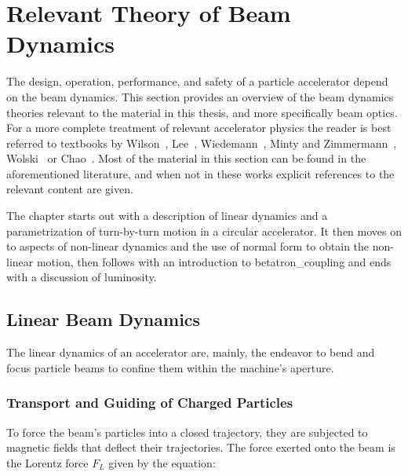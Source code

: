 \chapter{Relevant Theory of Beam Dynamics}
\label{chapter:theory}

The design, operation, performance, and safety of a particle accelerator depend on the \gls{beam} dynamics.
This section provides an overview of the beam dynamics theories relevant to the material in this thesis, and more specifically beam \gls{optics}.
For a more complete treatment of relevant accelerator physics the reader is best referred to textbooks by Wilson~\cite{BOOK:Wilson:Introcution_Particle_Accelerators}, Lee~\cite{BOOK:Lee:Accelerator_physics}, Wiedemann~\cite{BOOK:Wiedemann:Particle_Accelerator_Physics}, Minty and Zimmermann~\cite{BOOK:Minty:Measurements_Control_Charged_Particle_Beams}, Wolski~\cite{BOOK:Wolski:Beam_dynamics} or Chao~\cite{BOOK:Chao:Handbook_Accelerator_Physics_Engineering, BOOK:Chao:Collective_instabilities}.
Most of the material in this section can be found in the aforementioned literature, and when not in these works explicit references to the relevant content are given.

The chapter starts out with a description of linear dynamics and a parametrization of turn-by-turn motion in a circular accelerator.
It then moves on to aspects of non-linear dynamics and the use of normal form to obtain the non-linear motion, then follows with an introduction to \gls{betatron_coupling} and ends with a discussion of luminosity.


\section{Linear Beam Dynamics}
\label{section:linear_beam_dynamics}

The linear dynamics of an accelerator are, mainly, the endeavor to bend and focus particle beams to confine them within the machine's aperture.

\subsection{Transport and Guiding of Charged Particles}
\label{subsection:transport_and_guiding_of_charged_particles}

To force the beam's particles into a closed trajectory, they are subjected to magnetic fields that deflect their trajectories.
The force exerted onto the beam is the Lorentz force \(F_{L}\) given by the equation:

